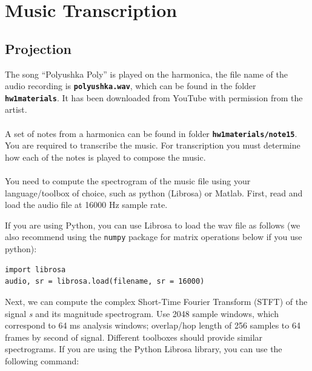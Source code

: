 \section{Music Transcription}

\subsection{Projection}
 The song ``Polyushka Poly'' is played on the harmonica, the file name of the audio recording is  \texttt{\textbf{polyushka.wav}}, which can be found in the folder \texttt{\textbf{hw1materials}}. It has been downloaded from YouTube with permission from the artist.
\\
\\
A set of notes from a harmonica can be found in folder \texttt{\textbf{hw1materials/note15}}. You are required to transcribe the music. For transcription you must determine how each of the notes is played to compose the music.
\\
\\
You need to compute the spectrogram of the music file using your language/toolbox of choice, such as python (Librosa) or Matlab. First, read and load the audio file at 16000 Hz sample rate. 


If you are using Python, you can use Librosa to load the wav file as follows (we also recommend using the \texttt{numpy} package for matrix operations below if you use python):

\begin{lstlisting}
import librosa
audio, sr = librosa.load(filename, sr = 16000)
\end{lstlisting}

Next, we can compute the complex Short-Time Fourier Transform (STFT) of the signal \textit{s} and its magnitude spectrogram. Use 2048 sample windows, which correspond to 64 ms analysis windows; overlap/hop length of 256 samples to 64 frames by second of signal. Different toolboxes should provide similar spectrograms. If you are using the Python Librosa library, you can use the following command:



